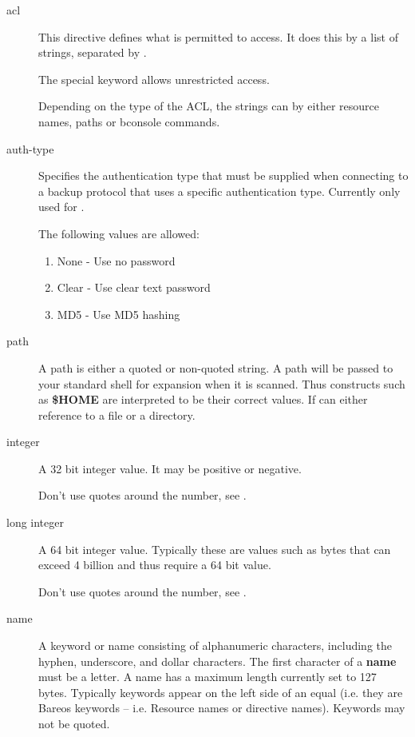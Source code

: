 \begin{description}

\item [acl]
    \label{DataTypeAcl}
This directive defines what is permitted to access.
It does this by a list of strings, separated by \parameter{,}.

The special keyword  allows unrestricted access.

Depending on the type of the ACL, the strings can by either resource names, paths or bconsole commands.


\item [auth-type]
    \label{DataTypeAuthType}
Specifies the authentication type that must be supplied when connecting to
a backup protocol that uses a specific authentication type.
Currently only used for .

The following values are allowed:
\begin{enumerate}
\item None - Use no password
\item Clear - Use clear text password
\item MD5 - Use MD5 hashing
\end{enumerate}


\item [path]
    \label{DataTypeDirectory}
   A path is either a quoted or  non-quoted string. A path will be
passed to your  standard shell for expansion when it is scanned. Thus
constructs such as {\bf \$HOME} are interpreted to be  their correct values.
If can either reference to a file or a directory.


\item [integer]
    \label{DataTypeInteger}
   A 32 bit integer value. It may be positive or negative.

   Don't use quotes around the number, see .


\item [long integer]
    \label{DataTypeLongInteger}
   A 64 bit integer value. Typically these  are values such as bytes that can
exceed 4 billion and thus  require a 64 bit value.

   Don't use quotes around the number, see .


\item [name]
    \label{DataTypeName}
   A keyword or name consisting of alphanumeric characters, including the
hyphen, underscore, and dollar  characters. The first character of a {\bf
name} must be  a letter.  A name has a maximum length currently set to 127
bytes.  Typically keywords appear on the left side of an equal (i.e.  they are
Bareos keywords -- i.e. Resource names or  directive names). Keywords may not
be quoted.


\end{description}
